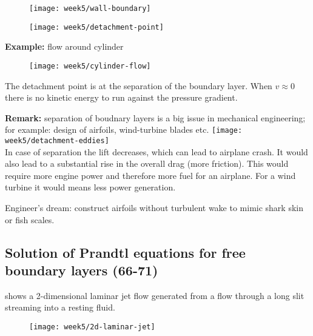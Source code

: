 \begin{figure}[!h]
    \centering
    \texttt{[image: week5/wall-boundary]}\\
    \caption{}
    \label{fig:wall-boundary}
\end{figure}

\begin{figure}[!h]
    \centering
    \texttt{[image: week5/detachment-point]}\\
    \caption{}
    \label{fig:detachment-point}
\end{figure}

\newpage
\textbf{Example:} flow around cylinder

\begin{figure}[!h]
    \centering
    \texttt{[image: week5/cylinder-flow]}\\
    \caption{}
    \label{fig:cylinder-flow}
\end{figure}

The detachment point is at the separation of the boundary layer. When $v\approx0$ there is no kinetic energy to run against the pressure gradient.

\begin{framed}
\textbf{Remark:} separation of boudnary layers is a big issue in mechanical engineering; for example: design of airfoils, wind-turbine blades etc.
{\center
\texttt{[image: week5/detachment-eddies]}\\
}
In case of separation the lift decreases, which can lead to airplane crash. It would also lead to a substantial rise in the overall drag (more friction). This would require more engine power and therefore more fuel for an airplane. For a wind turbine it would means less power generation.

Engineer's dream: construct airfoils without turbulent wake to mimic shark skin or fish scales.
\end{framed}

\subsection{Solution of Prandtl equations for free boundary layers (66-71)} 

 shows a 2-dimensional laminar jet flow generated from a flow through a long slit streaming into a resting fluid.

\begin{figure}[!h]
    \centering
    \texttt{[image: week5/2d-laminar-jet]}\\
    \caption{}
    \label{fig:2d-laminar-jet}
\end{figure}

